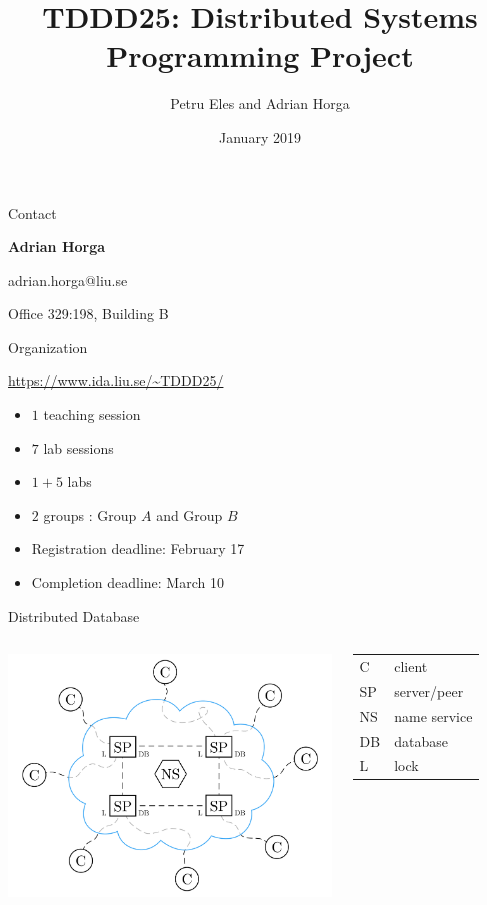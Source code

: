\documentclass[compress,xcolor=table]{beamer}
\title{%
  TDDD25: Distributed Systems\\%
  \vspace{0.1em}%
  Programming Project%
}
\author{Petru Eles and Adrian Horga}
\date{January 2019}
\institute[Link\"oping University]{
  Computer and Information Science\\
  Link\"oping University
}
\begin{document}
\frame[plain]{\titlepage}

\begin{frame}{Contact}
\begin{center}
  \textbf{Adrian Horga}

  adrian.horga@liu.se

  Office 329:198, Building B

\end{center}
\end{frame}

\begin{frame}{Organization}
  \begin{center}
    \url{https://www.ida.liu.se/~TDDD25/}
  \end{center}
  \begin{itemize}
    \item $1$ teaching session
    \item $7$ lab sessions
    \item $1 + 5$ labs
    \item $2$ groups : Group $A$ and Group $B$
    \item Registration deadline: February 17
    \item Completion deadline: March 10
  \end{itemize}
\end{frame}

\begin{frame}{Distributed Database}
\begin{columns}
  \column{7cm}
  \centering
  \includegraphics[scale=0.14,page=1]{include/assets/distributed-database}
  \column{3cm}
  \begin{tabular}{l @{ --- } l}
    \alert{C}  & client \\
    \alert{SP} & server/peer \\
    \alert{NS} & name service \\
    \alert{DB} & database \\
    \alert{L}  & lock
  \end{tabular}
\end{columns}
\end{frame}
\end{document}
